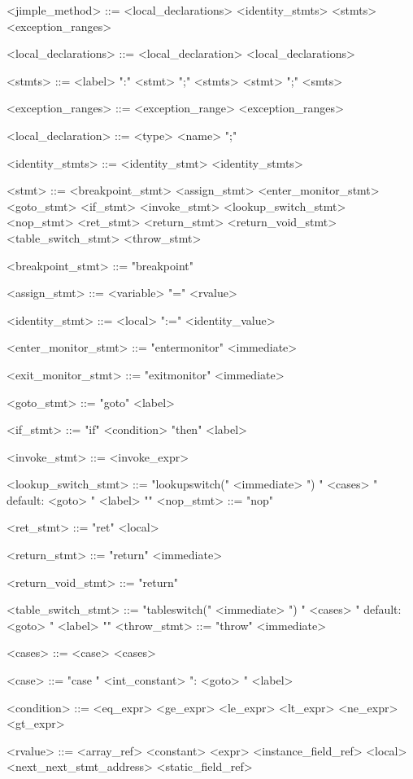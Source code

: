 \documentclass{report}
\begin{document}
\begin{grammar}
<jimple_method> ::= <local_declarations> <identity_stmts> <stmts> <exception_ranges>

<local_declarations> ::= <local_declaration> <local_declarations>

<stmts> ::= <label> ":" <stmt> ";" <stmts> \alt  <stmt> ";" <smts>

<exception_ranges> ::= <exception_range> <exception_ranges>

<local_declaration> ::= <type> <name> ";"

<identity_stmts> ::= <identity_stmt> <identity_stmts>

<stmt> ::= <breakpoint_stmt> \alt <assign_stmt> \alt <enter_monitor_stmt>
<goto_stmt> \alt <if_stmt> \alt <invoke_stmt> \alt <lookup_switch_stmt> \alt <nop_stmt> \alt <ret_stmt> \alt <return_stmt> \alt <return_void_stmt> \alt <table_switch_stmt> \alt <throw_stmt>

<breakpoint_stmt> ::= "breakpoint"

<assign_stmt> ::= <variable> "=" <rvalue>

<identity_stmt> ::= <local> ":=" <identity_value>

<enter_monitor_stmt> ::= "entermonitor" <immediate>

<exit_monitor_stmt> ::= "exitmonitor" <immediate>

<goto_stmt> ::= "goto" <label>

<if_stmt> ::= "if" <condition> "then" <label>

<invoke_stmt> ::= <invoke_expr>

<lookup_switch_stmt> ::= "lookupswitch(" <immediate> ") {" <cases> " default: <goto> " <label> "}" <nop_stmt> ::= "nop"

<ret_stmt> ::= "ret" <local>

<return_stmt> ::= "return" <immediate>

<return_void_stmt> ::= "return" 

<table_switch_stmt> ::= "tableswitch(" <immediate> ") {" <cases> " default: <goto> " <label> "}" <throw_stmt> ::= "throw" <immediate>

<cases> ::= <case> <cases>

<case> ::= "case " <int_constant> ": <goto> " <label>

<condition> ::= <eq_expr> \alt <ge_expr> \alt <le_expr> \alt <lt_expr> \alt <ne_expr> \alt <gt_expr>

<rvalue> ::= <array_ref> \alt <constant> \alt <expr> \alt <instance_field_ref> \alt <local> <next_next_stmt_address> \alt <static_field_ref>


\end{grammar}
\end{document}
